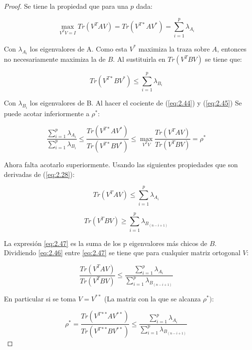 \begin{proof}
Se tiene la propiedad que para una $p$ dada:


\begin{equation}\label{eq:2.44}
\max_{V^T V = I} Tr(V^T A V) =  Tr(V^{T*} A V^*) = \sum_{i=1}^p \lambda_{A_i }
\end{equation}
 
Con $\lambda_{A_i}$ los eigenvalores de A. Como esta $V^*$ maximiza la traza sobre $A$, entonces no necesariamente maximiza la de $B$. Al sustituirla en $Tr(V^{T} B V)$ se tiene que: 

\begin{equation}\label{eq:2.45}
Tr(V^{T*} B V^*) \leq \sum_{i=1}^p \lambda_{B_i }
\end{equation}

Con $\lambda_{B_i}$ los eigenvalores de B. Al hacer el cociente de (\ref{eq:2.44}) y (\ref{eq:2.45}) Se puede acotar inferiormente a $\rho^*$:


\begin{equation*}
  \frac{\sum_{i=1}^p \lambda_{A_i}} {\sum_{i=1}^p \lambda_{B_i}} \leq \frac{Tr(V^{T*} A V^*)}{Tr(V^{T*} B V^*)} \leq \max_{V^T V} \frac{Tr(V^{T} A V)}{Tr(V^{T} B V)} = \rho^*
\end{equation*}

Ahora falta acotarlo superiormente. Usando las siguientes propiedades que son derivadas de (\ref{eq:2.28}):

\begin{equation}\label{eq:2.46}
  Tr(V^T A V) \leq \sum_{i=1}^p \lambda_{A_i} 
\end{equation}

\begin{equation}\label{eq:2.47}
  Tr(V^T B V) \geq \sum_{i=1}^p \lambda_{B_{(n-i+1)}}
\end{equation}

La expresión \ref{eq:2.47} es la suma de los p eigenvalores más chicos de $B$. Dividiendo \ref{eq:2.46} entre \ref{eq:2.47} se tiene que para cualquier matriz ortogonal $V$:

\begin{equation}\label{eq:2.48}
   \frac{Tr(V^{T} A V)}{Tr(V^{T} B V)} \leq \frac{\sum_{i=1}^p \lambda_{A_i}}{\sum_{i=1}^p \lambda_{B_{(n-i+1)}}}
\end{equation}

En particular si se toma $V = V^{**}$ (La matriz con la que se alcanza $\rho^*)$:

\begin{equation}\label{eq:2.49}
  \rho^* = \frac{Tr(V^{T**} A V^{**})}{Tr(V^{T**} B V^{**})} \leq \frac{\sum_{i=1}^p \lambda_{A_i}}{\sum_{i=1}^p \lambda_{B_{(n-i+1)}}}
\end{equation}

\end{proof}
